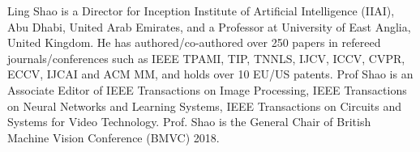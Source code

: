 \documentclass[10pt,journal,twocolumn]{IEEEtran}
\begin{document}


\begin{IEEEbiography}{Ling Shao}
is a Director for Inception Institute of Artificial Intelligence (IIAI), Abu Dhabi, United Arab Emirates, and a Professor at University of East Anglia, United Kingdom. He has authored/co-authored over 250 papers in refereed journals/conferences such as IEEE TPAMI, TIP, TNNLS, IJCV, ICCV, CVPR, ECCV, IJCAI and ACM MM, and holds over 10 EU/US patents. Prof Shao is an Associate Editor of IEEE Transactions on Image Processing, IEEE Transactions on Neural Networks and Learning Systems, IEEE Transactions on Circuits and Systems for Video Technology.  Prof. Shao is the General Chair of British Machine Vision Conference (BMVC) 2018.
\end{IEEEbiography}
\end{document}
